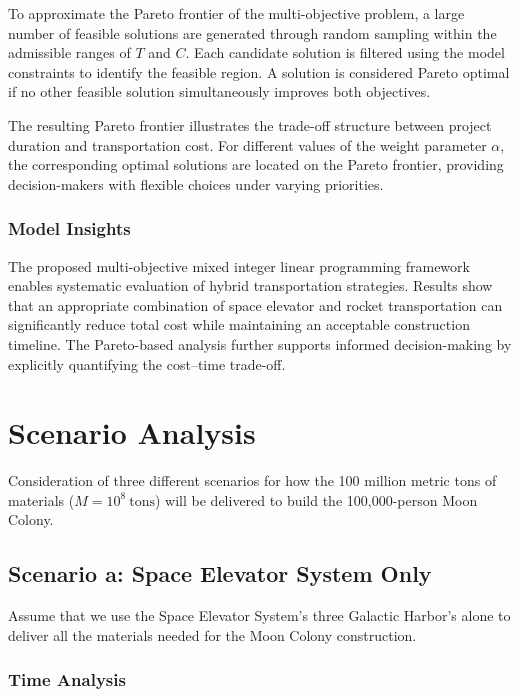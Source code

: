 \documentclass{mcmthesis}
\begin{document}
To approximate the Pareto frontier of the multi-objective problem, a large number of feasible solutions are generated through random sampling within the admissible ranges of $T$ and $C$.
Each candidate solution is filtered using the model constraints to identify the feasible region.
A solution is considered Pareto optimal if no other feasible solution simultaneously improves both objectives.

The resulting Pareto frontier illustrates the trade-off structure between project duration and transportation cost.
For different values of the weight parameter $\alpha$, the corresponding optimal solutions are located on the Pareto frontier, providing decision-makers with flexible choices under varying priorities.

\subsubsection{Model Insights}

The proposed multi-objective mixed integer linear programming framework enables systematic evaluation of hybrid transportation strategies.
Results show that an appropriate combination of space elevator and rocket transportation can significantly reduce total cost while maintaining an acceptable construction timeline.
The Pareto-based analysis further supports informed decision-making by explicitly quantifying the cost--time trade-off.



\section{Scenario Analysis}

Consideration of three different scenarios for how the 100 million metric tons of materials ($M=10^8\ \text{tons}$) will
be delivered to build the 100,000-person Moon Colony.

\subsection{Scenario a: Space Elevator System Only}

Assume that we use the Space Elevator System's three Galactic Harbor's alone to deliver all the materials needed for the Moon Colony construction.

\subsubsection{Time Analysis}
\end{document}
